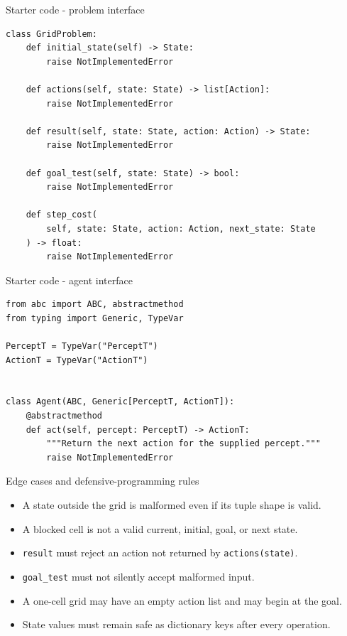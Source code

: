 \documentclass[aspectratio=169,11pt]{beamer}
\begin{document}
\begin{frame}[fragile]{Starter code - problem interface}
\begin{lstlisting}
class GridProblem:
    def initial_state(self) -> State:
        raise NotImplementedError

    def actions(self, state: State) -> list[Action]:
        raise NotImplementedError

    def result(self, state: State, action: Action) -> State:
        raise NotImplementedError

    def goal_test(self, state: State) -> bool:
        raise NotImplementedError

    def step_cost(
        self, state: State, action: Action, next_state: State
    ) -> float:
        raise NotImplementedError
\end{lstlisting}
\end{frame}

\begin{frame}[fragile]{Starter code - agent interface}
\begin{lstlisting}
from abc import ABC, abstractmethod
from typing import Generic, TypeVar

PerceptT = TypeVar("PerceptT")
ActionT = TypeVar("ActionT")


class Agent(ABC, Generic[PerceptT, ActionT]):
    @abstractmethod
    def act(self, percept: PerceptT) -> ActionT:
        """Return the next action for the supplied percept."""
        raise NotImplementedError
\end{lstlisting}
\end{frame}

\begin{frame}{Edge cases and defensive-programming rules}
  \begin{itemize}
    \item A state outside the grid is malformed even if its tuple shape is valid.
    \item A blocked cell is not a valid current, initial, goal, or next state.
    \item \texttt{result} must reject an action not returned by
      \texttt{actions(state)}.
    \item \texttt{goal\_test} must not silently accept malformed input.
    \item A one-cell grid may have an empty action list and may begin at the goal.
    \item State values must remain safe as dictionary keys after every operation.
  \end{itemize}
\end{frame}
\end{document}
